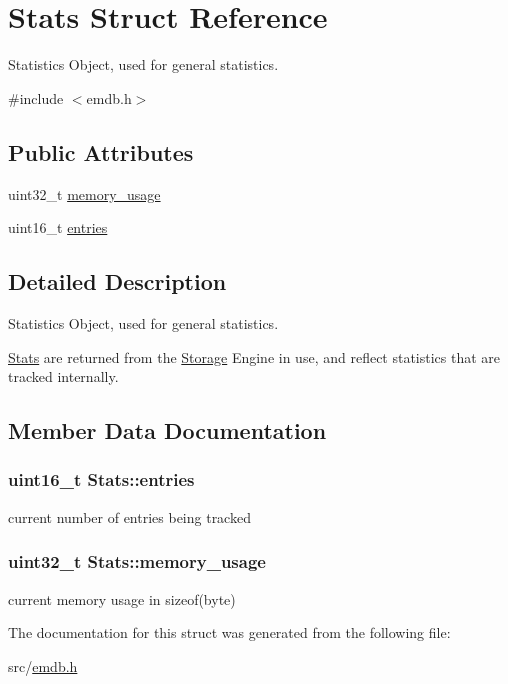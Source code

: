\hypertarget{struct_stats}{}\section{Stats Struct Reference}
\label{struct_stats}


Statistics Object, used for general statistics.  




{\ttfamily \#include $<$emdb.\+h$>$}

\subsection*{Public Attributes}
\begin{DoxyCompactItemize}
\item 
uint32\+\_\+t \hyperlink{struct_stats_a23b10e5eb4ab27ee645b8a75425893d1}{memory\+\_\+usage}
\item 
uint16\+\_\+t \hyperlink{struct_stats_a0287a74f4140d399d2aa1db694c5c5db}{entries}
\end{DoxyCompactItemize}


\subsection{Detailed Description}
Statistics Object, used for general statistics. 

\hyperlink{struct_stats}{Stats} are returned from the \hyperlink{struct_storage}{Storage} Engine in use, and reflect statistics that are tracked internally. 

\subsection{Member Data Documentation}
\hypertarget{struct_stats_a0287a74f4140d399d2aa1db694c5c5db}{}
\subsubsection[{entries}]{\setlength{\rightskip}{0pt plus 5cm}uint16\+\_\+t Stats\+::entries}\label{struct_stats_a0287a74f4140d399d2aa1db694c5c5db}
current number of entries being tracked \hypertarget{struct_stats_a23b10e5eb4ab27ee645b8a75425893d1}{}
\subsubsection[{memory\+\_\+usage}]{\setlength{\rightskip}{0pt plus 5cm}uint32\+\_\+t Stats\+::memory\+\_\+usage}\label{struct_stats_a23b10e5eb4ab27ee645b8a75425893d1}
current memory usage in sizeof(byte) 

The documentation for this struct was generated from the following file\+:\begin{DoxyCompactItemize}
\item 
src/\hyperlink{emdb_8h}{emdb.\+h}\end{DoxyCompactItemize}
